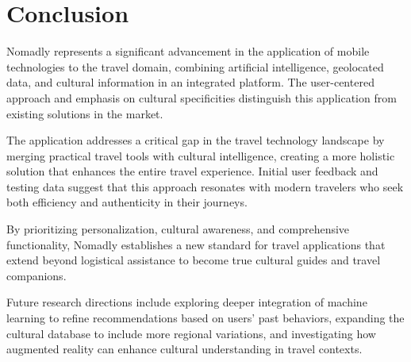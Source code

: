 \documentclass[11pt, a4paper]{article}
\begin{document}
\section{Conclusion}

Nomadly represents a significant advancement in the application of mobile technologies to the travel domain, combining artificial intelligence, geolocated data, and cultural information in an integrated platform. The user-centered approach and emphasis on cultural specificities distinguish this application from existing solutions in the market.

The application addresses a critical gap in the travel technology landscape by merging practical travel tools with cultural intelligence, creating a more holistic solution that enhances the entire travel experience. Initial user feedback and testing data suggest that this approach resonates with modern travelers who seek both efficiency and authenticity in their journeys.

By prioritizing personalization, cultural awareness, and comprehensive functionality, Nomadly establishes a new standard for travel applications that extend beyond logistical assistance to become true cultural guides and travel companions.

Future research directions include exploring deeper integration of machine learning to refine recommendations based on users' past behaviors, expanding the cultural database to include more regional variations, and investigating how augmented reality can enhance cultural understanding in travel contexts.


\end{document}
